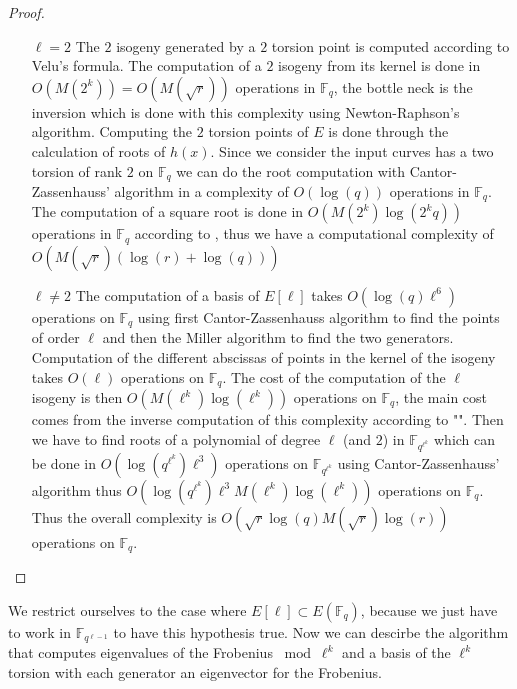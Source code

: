 \documentclass{lms}
\begin{document}
\begin{proof}
\begin{enumerate}
\item[$\ell = 2$]
The $2$ isogeny generated by a $2$ torsion point is computed according to Velu's formula.
The computation of a $2$ isogeny from its kernel is done in $O(M(2^k))=O(M(\sqrt{r}))$ operations in $\mathbb{F}_q$, the bottle neck is the inversion which is done with this complexity using Newton-Raphson's algorithm.
\newline
Computing the $2$ torsion points of $E$ is done through the calculation of roots of $h(x)$.
Since we consider the input curves has a two torsion of rank $2$ on $\mathbb{F}_q$ we can do the root computation with Cantor-Zassenhauss' algorithm in a complexity of $O( \log(q))$ operations in $\mathbb{F}_q$. 
The computation of a square root is done in $O(M(2^k)\log(2^kq))$ operations in $\mathbb{F}_q$ according to \cite{DBLP:journals/dcc/DoliskaniS15}, thus we have a computational complexity of $O(M(\sqrt{r})(\log(r)+\log(q)))$
\item[$\ell \neq 2$]The computation of a basis of $E[\ell]$ takes $O(\log(q)\ell^6 )$ operations on $\mathbb{F}_q$ using first Cantor-Zassenhauss algorithm to find the points of order $\ell$ and then the Miller algorithm to find  the two generators. Computation of the different abscissas of points in the kernel of the isogeny takes $O(\ell )$ operations on $\mathbb{F}_q$. The cost of the computation of the $\ell$ isogeny is then $O(M(\ell^k)\log(\ell^k))$ operations on $\mathbb{F}_{q}$, the main cost comes from the inverse computation of this complexity according to "\cite{DeDoSc13}". Then we have to find roots of a polynomial of degree $\ell$ (and $2$) in $\mathbb{F}_{q^{\ell^k}}$ which can be done in $O(\log(q^{\ell^k})\ell^3)$ operations on $\mathbb{F}_{q^{\ell^k}}$ using Cantor-Zassenhauss' algorithm thus $O(\log(q^{\ell^k})\ell^3 M(\ell^k)\log(\ell^k))$ operations on $\mathbb{F}_q$. Thus the overall complexity is $O(\sqrt{r} \log(q) M(\sqrt{r})\log(r))$ operations on $\mathbb{F}_q$.
\end{enumerate}
\end{proof}

We restrict ourselves to the case where $E[\ell] \subset E(\mathbb{F}_q)$, because we just have to work in $\mathbb{F}_{q^{\ell-1}}$ to have this hypothesis true. Now we can descirbe the algorithm that computes eigenvalues of the Frobenius $\bmod \ell^k$ and a  basis of the $\ell^{k}$ torsion with each generator an eigenvector for the Frobenius.
\end{document}
